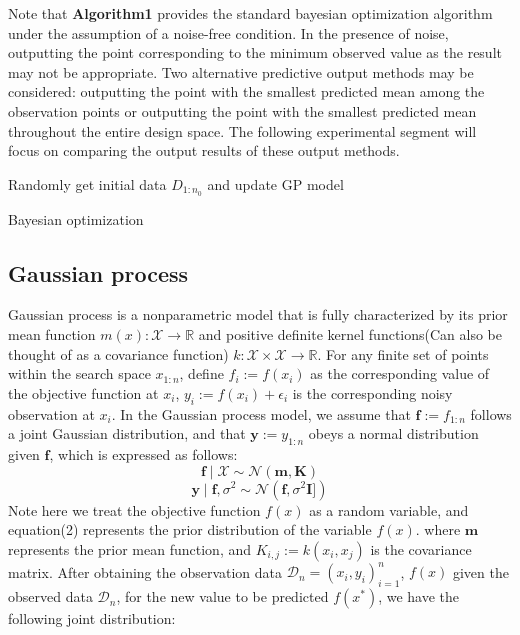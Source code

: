 \documentclass{article}
\begin{document}
\hspace{2em}
Note that \textbf{Algorithm1} provides the standard bayesian optimization algorithm under the assumption of a noise-free condition. In the presence of noise, outputting the point corresponding to the minimum observed value as the result may not be appropriate. Two alternative predictive output methods may be considered: outputting the point with the smallest predicted mean among the observation points or outputting the point with the smallest predicted mean throughout the entire design space. The following experimental segment will focus on comparing the output results of these output methods.

\begin{algorithm}[htb]
    \SetAlgoLined
  
    Randomly get initial data $D_{1:n_0}$ and update GP model\;
    \caption{Bayesian optimization}
\end{algorithm}

\subsection{Gaussian process}
\hspace{2em}Gaussian process is a nonparametric model that is fully characterized by its prior mean function $m(x):\mathcal{X} \rightarrow \mathbb{R}$ and positive definite kernel functions(Can also be thought of as a covariance function) $k:\mathcal{X} \times \mathcal{X} \rightarrow \mathbb{R}$. For any finite set of points within the search space $x_{1:n}$, define $f_i:=f(x_i)$ as the corresponding value of the objective function at $x_i$, $y_i:=f(x_i)+\epsilon_i$ is the corresponding noisy observation at $x_i$. In the Gaussian process model, we assume that $\textbf{f}:=f_{1:n}$ follows a joint Gaussian distribution, and that $\textbf{y}:=y_{1:n}$ obeys a normal distribution given $\textbf{f}$, which is expressed as follows:
\begin{equation}\label{eq2}
    \textbf{f}\mid\mathcal{X} \sim \mathcal{N}(\textbf{m},\textbf{K})
    \end{equation}
    \begin{equation}\label{eq3}
    \textbf{y}\mid \textbf{f},\sigma^2 \sim \mathcal{N}(\textbf{f},\sigma^2\textbf{I}])
    \end{equation}
Note here we treat the objective function $f(x)$ as a random variable, and equation(2) represents the prior distribution of the variable $f(x)$. where $\textbf{m}$ represents the prior mean function, and $K_{i,j}:=k(x_i,x_j)$ is the covariance matrix. After obtaining the observation data $\mathcal{D}_n={(x_i,y_i)^n_{i=1}}$, $f(x)$ given the observed data $\mathcal{D}_n$, for the new value to be predicted $f(x^*)$, we have the following joint distribution:
\end{document}
